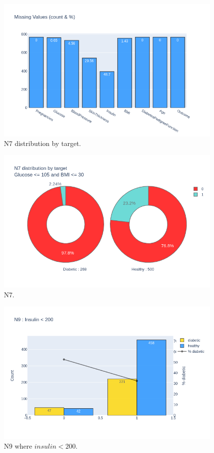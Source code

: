 \documentclass[12pt]{article}
\begin{document}
\begin{figure}[ht]
\centering
\includegraphics[width=1\textwidth]{newplot(2).png}
\caption{N7 distribution by target.}
\end{figure}

\begin{figure}[ht]
\centering
\includegraphics[width=1\textwidth]{newplot(30).png}
\caption{N7.}
\end{figure}


\begin{figure}[ht]
\centering
\includegraphics[width=1\textwidth]{newplot(32).png}
\caption{N9 where $insulin<200$.}
\end{figure}
\end{document}
